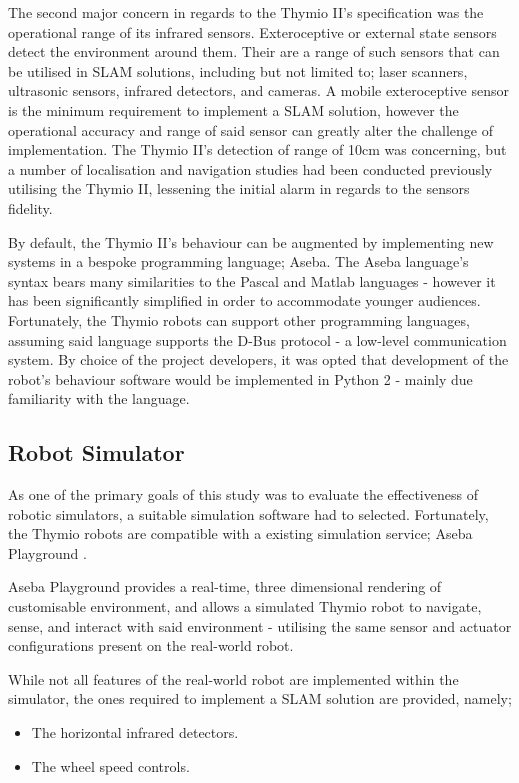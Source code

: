 The second major concern in regards to the Thymio II's specification was the
operational range of its infrared sensors.
Exteroceptive or external state sensors detect the environment around
them.
Their are a range of such sensors that can be utilised in SLAM solutions,
including but not limited to; laser scanners, ultrasonic sensors, infrared
detectors, and cameras.
A mobile exteroceptive sensor is the minimum requirement to implement a SLAM
solution, however the operational accuracy and range of said sensor can
greatly alter the challenge of implementation.
The Thymio II's detection of range of 10cm was concerning, but a number of
localisation and navigation studies had been conducted previously
\cite{Wang2016} utilising the Thymio II, lessening the initial alarm in
regards to the sensors fidelity.

By default, the Thymio II's behaviour can be augmented by implementing
new systems in a bespoke programming language; Aseba.
The Aseba language's syntax bears many similarities to the Pascal and
Matlab languages - however it has been significantly simplified in order to
accommodate younger audiences.
Fortunately, the Thymio robots can support other programming languages,
assuming said language supports the D-Bus protocol - a low-level communication
system.
By choice of the project developers, it was opted that development of the
robot's behaviour software would be implemented in Python 2 - mainly due
familiarity with the language.

\subsection{Robot Simulator}
As one of the primary goals of this study was to evaluate the effectiveness of
robotic simulators, a suitable simulation software had to selected.
Fortunately, the Thymio robots are compatible with a existing simulation
service; Aseba Playground \cite{aseba-community}.

Aseba Playground provides a real-time, three dimensional rendering of
customisable environment, and allows a simulated Thymio robot to navigate,
sense, and interact with said environment - utilising the same sensor and
actuator configurations present on the real-world robot.

While not all features of the real-world robot are implemented within the
simulator, the ones required to implement a SLAM solution are provided, namely;

\begin{itemize}
\item The horizontal infrared detectors.
\item The wheel speed controls.
\end{itemize}

